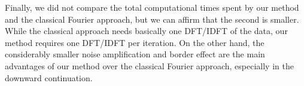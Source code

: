 Finally, we did not compare the total computational times spent by our method and the classical 
Fourier approach, but we can affirm that the second is smaller. 
While the classical approach needs basically one DFT/IDFT of the data, 
our method requires one DFT/IDFT per iteration. 
On the other hand, the considerably smaller noise amplification and 
border effect are the main advantages of our method over the classical Fourier 
approach, especially in the downward continuation.
